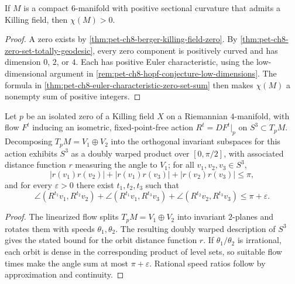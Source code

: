 \begin{corollary}
  \label{cor:pet-ch8-positive-euler-characteristic-6manifold}
  If $M$ is a compact $6$-manifold with positive sectional curvature that
  admits a Killing field, then $\chi(M)>0$.
\end{corollary}
\begin{proof}
  \sketch
  A zero exists by \cref{thm:pet-ch8-berger-killing-field-zero}. By
  \cref{thm:pet-ch8-zero-set-totally-geodesic}, every zero component is
  positively curved and has dimension \(0\), \(2\), or \(4\). Each has positive
  Euler characteristic, using the low-dimensional argument in
  \cref{rem:pet-ch8-hopf-conjecture-low-dimensions}. The formula in
  \cref{thm:pet-ch8-euler-characteristic-zero-set-sum} then makes
  \(\chi(M)\) a nonempty sum of positive integers.
\end{proof}

\begin{lemma}
  \label{lem:pet-ch8-isolated-zero-orbit-angle-bound}
  Let $p$ be an isolated zero of a Killing field $X$ on a Riemannian
  $4$-manifold, with flow $F^t$ inducing an isometric, fixed-point-free action
  $R^t=DF^t|_p$ on $S^3\subset T_pM$. Decomposing $T_pM=V_1\oplus V_2$ into the
  orthogonal invariant subspaces for this action exhibits $S^3$ as a doubly
  warped product over $[0,\pi/2]$, with associated distance function $r$
  measuring the angle to $V_1$; for all $v_1,v_2,v_3\in S^3$,
  \[
    \lvert r(v_1)r(v_2)\rvert+\lvert r(v_1)r(v_3)\rvert
    +\lvert r(v_2)r(v_3)\rvert\le\pi,
  \]
  and for every $\varepsilon>0$ there exist $t_1,t_2,t_3$ such that
  \[
    \angle(R^{t_1}v_1,R^{t_2}v_2)+\angle(R^{t_1}v_1,R^{t_3}v_3)+\angle(R^{t_2}v_2,R^{t_3}v_3)\le\pi+\varepsilon.
  \]
\end{lemma}
\begin{proof}
  \sketch
  The linearized flow splits \(T_pM=V_1\oplus V_2\) into invariant
  \(2\)-planes and rotates them with speeds \(\theta_1,\theta_2\). The resulting
  doubly warped description of \(S^3\) gives the stated bound for the orbit
  distance function \(r\). If \(\theta_1/\theta_2\) is irrational, each orbit
  is dense in the corresponding product of level sets, so suitable flow times
  make the angle sum at most \(\pi+\varepsilon\). Rational speed ratios follow
  by approximation and continuity.
\end{proof}

